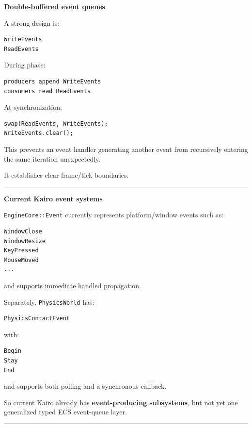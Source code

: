 \textbf{Double-buffered event queues}

A strong design is:

\begin{verbatim}
WriteEvents
ReadEvents
\end{verbatim}

During phase:

\begin{verbatim}
producers append WriteEvents
consumers read ReadEvents
\end{verbatim}

At synchronization:

\begin{verbatim}
swap(ReadEvents, WriteEvents);
WriteEvents.clear();
\end{verbatim}

This prevents an event handler generating another event from recursively entering the same iteration unexpectedly.

It establishes clear frame/tick boundaries.

\begin{center}\rule{0.5\linewidth}{0.5pt}\end{center}

\textbf{Current Kairo event systems}

\texttt{EngineCore::Event} currently represents platform/window events such as:

\begin{verbatim}
WindowClose
WindowResize
KeyPressed
MouseMoved
...
\end{verbatim}

and supports immediate handled propagation.

Separately, \texttt{PhysicsWorld} has:

\begin{verbatim}
PhysicsContactEvent
\end{verbatim}

with:

\begin{verbatim}
Begin
Stay
End
\end{verbatim}

and supports both polling and a synchronous callback.

So current Kairo already has \textbf{event-producing subsystems}, but not yet one generalized typed ECS event-queue layer.

\begin{center}\rule{0.5\linewidth}{0.5pt}\end{center}

